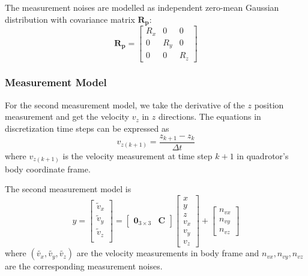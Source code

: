 \documentclass[letterpaper, 10 pt, conference]{ieeeconf}  %
\newcommand{\rom}[1]{\uppercase\expandafter{\romannumeral #1\relax}}
\begin{document}
The measurement noises are modelled as independent zero-mean Gaussian distribution with covariance matrix $\bm{R_p}$:
\begin{equation}
\renewcommand\arraystretch{1.2}
\bm{R_p} = \begin{bmatrix}
R_{x}  & 0   & 0 \\
0  & R_{y}   & 0 \\
0  & 0   & R_{z} 
\end{bmatrix}
\end{equation}

\subsubsection{Measurement Model \rom{2}}
For the second measurement model, we take the derivative of the $z$ position measurement and get the velocity $v_z$ in $z$ directions. The equations in discretization time steps can be expressed as
\begin{equation}
v_{z(k+1)} = \frac{z_{k+1}-z_{k}}{\Delta t} 
\end{equation} 
where $v_{z(k+1)}$ is the velocity measurement at time step $k+1$ in quadrotor's body coordinate frame.

The second measurement model is
\begin{equation}
\renewcommand\arraystretch{1.2}
y=\begin{bmatrix}
\tilde{v}_x   \\
\tilde{v}_y   \\
\tilde{v}_z   \\
\end{bmatrix}=\begin{bmatrix}
\bm{0}_{3\times 3} & \bm{C}
\end{bmatrix}\begin{bmatrix}
	x   \\
	y   \\
	z   \\
	v_x   \\
	v_y   \\
	v_z   
\end{bmatrix}+\begin{bmatrix}
n_{vx}   \\
n_{vy}   \\
n_{vz}
\end{bmatrix}
\end{equation}
where $(\tilde{v_x},\tilde{v_y},\tilde{v_z})$ are the velocity measurements in body frame and $n_{vx},n_{vy},n_{vz}$ are the corresponding measurement noises. 
\end{document}

